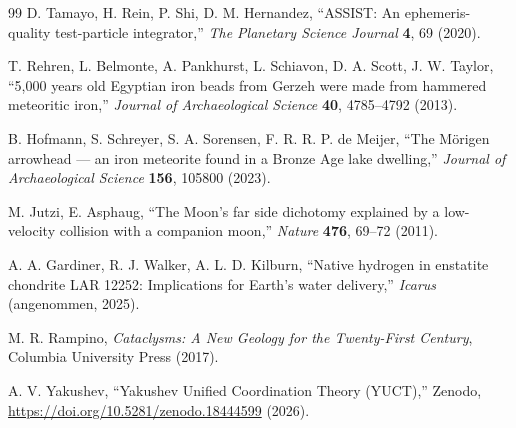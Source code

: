 \documentclass[11pt,a4paper]{article}
\begin{document}
\begin{thebibliography}{99}
		D. Tamayo, H. Rein, P. Shi, D. M. Hernandez, ``ASSIST: An ephemeris-quality test-particle integrator,''
		\emph{The Planetary Science Journal} \textbf{4}, 69 (2020).
		
		T. Rehren, L. Belmonte, A. Pankhurst, L. Schiavon, D. A. Scott, J. W. Taylor, ``5,000 years old Egyptian iron beads from Gerzeh were made from hammered meteoritic iron,''
		\emph{Journal of Archaeological Science} \textbf{40}, 4785–4792 (2013).
		
		B. Hofmann, S. Schreyer, S. A. Sorensen, F. R. R. P. de Meijer, ``The Mörigen arrowhead — an iron meteorite found in a Bronze Age lake dwelling,''
		\emph{Journal of Archaeological Science} \textbf{156}, 105800 (2023).
		
		M. Jutzi, E. Asphaug, ``The Moon's far side dichotomy explained by a low-velocity collision with a companion moon,''
		\emph{Nature} \textbf{476}, 69–72 (2011).
		
		A. A. Gardiner, R. J. Walker, A. L. D. Kilburn, ``Native hydrogen in enstatite chondrite LAR 12252: Implications for Earth's water delivery,''
		\emph{Icarus} (angenommen, 2025).
		
		M. R. Rampino, \emph{Cataclysms: A New Geology for the Twenty-First Century},
		Columbia University Press (2017).
		
		A. V. Yakushev, ``Yakushev Unified Coordination Theory (YUCT),''
		Zenodo, \url{https://doi.org/10.5281/zenodo.18444599} (2026).
		

\end{thebibliography}
\end{document}

